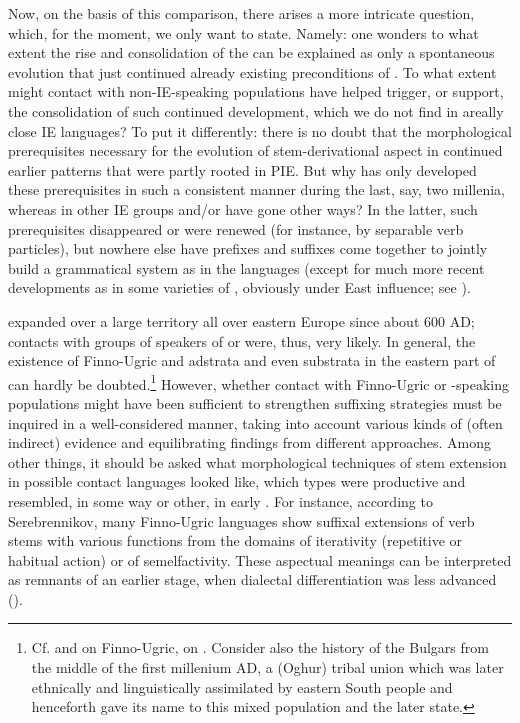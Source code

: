 \documentclass[output=paper]{langsci/langscibook}
\begin{document}
Now, on the basis of this comparison, there arises a more intricate question, which, for the moment, we only want to state. Namely: one wonders to what extent the rise and consolidation of the   can be explained as only a spontaneous evolution that just continued already existing preconditions of . To what extent might contact with non-IE-speaking populations have helped trigger, or support, the consolidation of such continued development, which we do not find in areally close IE languages? To put it differently: there is no doubt that the morphological prerequisites necessary for the evolution of stem-derivational aspect in  continued earlier patterns that were partly rooted in PIE. But why has only  developed these prerequisites in such a consistent manner during the last, say, two millenia, whereas in other IE groups  and/or  have gone other ways? In the latter, such prerequisites disappeared or were renewed (for instance, by separable verb particles), but nowhere else have prefixes and suffixes come together to jointly build a grammatical system as in the  languages (except for much more recent developments as in some varieties of , obviously under East  influence; see ).

 expanded over a large territory all over eastern Europe since about 600 AD; contacts with groups of speakers of  or  were, thus, very likely. In general, the existence of Finno-Ugric and  adstrata and even substrata in the eastern part of  can hardly be doubted.\footnote{Cf. \citet{Veenker1967} and \citet{Haarmann2014} on Finno-Ugric, \citet{Stachowski2014} on . Consider also the history of the Bulgars from the middle of the first millenium AD, a  (Oghur) tribal union which was later ethnically and linguistically assimilated by eastern South  people and henceforth gave its name to this mixed population and the later state.} However, whether contact with Finno-Ugric or -speaking populations might have been sufficient to strengthen suffixing strategies must be inquired in a well-considered manner, taking into account various kinds of (often indirect) evidence and equilibrating findings from different approaches. Among other things, it should be asked what morphological techniques of stem extension in possible contact languages looked like, which types were productive and resembled, in some way or other,  in early . For instance, according to Serebrennikov, many Finno-Ugric languages show suffixal extensions of verb stems with various functions from the domains of iterativity (repetitive or habitual action) or of semelfactivity. These aspectual meanings can be interpreted as remnants of an earlier stage, when dialectal differentiation was less advanced (\citealt[31–34, 188]{Serebrennikov1960}). 
\end{document}
